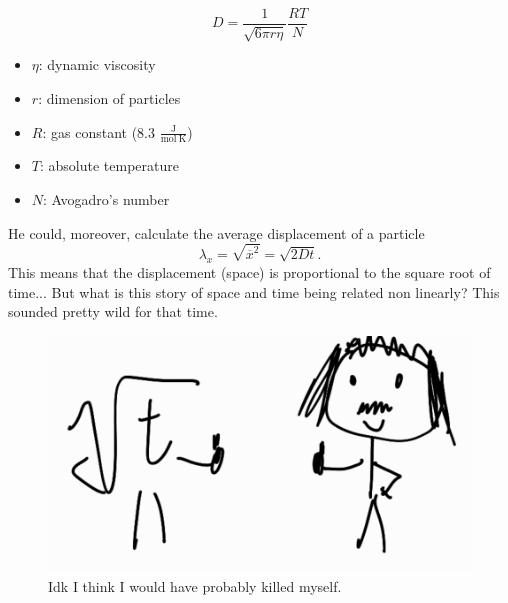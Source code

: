 \documentclass[12pt]{report}
\begin{document}
\noindent
\begin{minipage}{0.5\textwidth}
	\begin{equation*}
		D=\frac{1}{\sqrt{6\pi r\eta}}\frac{RT}{N}
	\end{equation*}
\end{minipage}\begin{minipage}{0.5\textwidth}
\begin{itemize}
	\item $\eta$: dynamic viscosity
	\item $r$: dimension of particles
	\item $R$: gas constant (8.3 $\frac{\mathrm{J}}{\mathrm{mol~K}}$)
	\item $T$: absolute temperature
	\item $N$: Avogadro's number
\end{itemize}
\end{minipage}
He could, moreover, calculate the average displacement of a particle
\begin{equation*}
	\lambda_{x}=\sqrt{\overline{x}^{2}}=\sqrt{2Dt}.
\end{equation*}
This means that the displacement (space) is proportional to the square root of time... But what is this story of space and time being related non linearly? This sounded pretty wild for that time.
\begin{figure}[h]
	\centering
	\includegraphics[width=0.5\linewidth]{img/screenshot007}
	\caption{Idk I think I would have probably killed myself.}
	\label{fig:screenshot007}
\end{figure}
\end{document}
